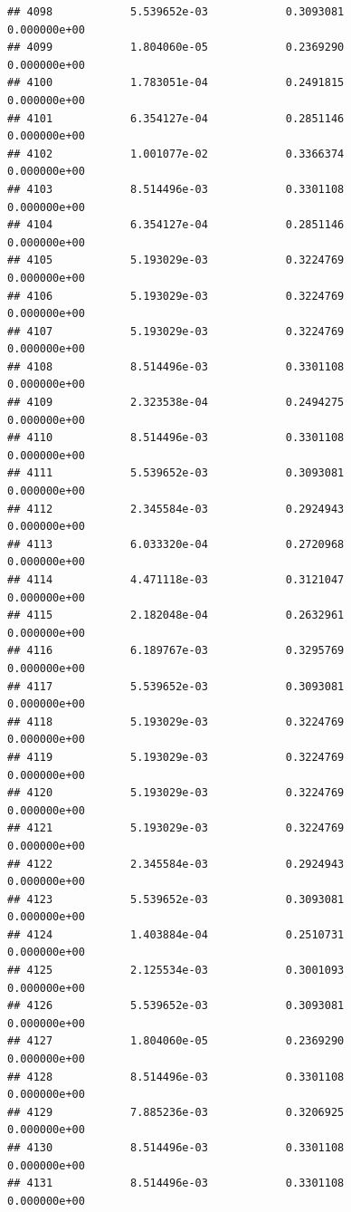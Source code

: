 \documentclass[
]{article}
\begin{document}
\begin{verbatim}
## 4098            5.539652e-03            0.3093081            0.000000e+00
## 4099            1.804060e-05            0.2369290            0.000000e+00
## 4100            1.783051e-04            0.2491815            0.000000e+00
## 4101            6.354127e-04            0.2851146            0.000000e+00
## 4102            1.001077e-02            0.3366374            0.000000e+00
## 4103            8.514496e-03            0.3301108            0.000000e+00
## 4104            6.354127e-04            0.2851146            0.000000e+00
## 4105            5.193029e-03            0.3224769            0.000000e+00
## 4106            5.193029e-03            0.3224769            0.000000e+00
## 4107            5.193029e-03            0.3224769            0.000000e+00
## 4108            8.514496e-03            0.3301108            0.000000e+00
## 4109            2.323538e-04            0.2494275            0.000000e+00
## 4110            8.514496e-03            0.3301108            0.000000e+00
## 4111            5.539652e-03            0.3093081            0.000000e+00
## 4112            2.345584e-03            0.2924943            0.000000e+00
## 4113            6.033320e-04            0.2720968            0.000000e+00
## 4114            4.471118e-03            0.3121047            0.000000e+00
## 4115            2.182048e-04            0.2632961            0.000000e+00
## 4116            6.189767e-03            0.3295769            0.000000e+00
## 4117            5.539652e-03            0.3093081            0.000000e+00
## 4118            5.193029e-03            0.3224769            0.000000e+00
## 4119            5.193029e-03            0.3224769            0.000000e+00
## 4120            5.193029e-03            0.3224769            0.000000e+00
## 4121            5.193029e-03            0.3224769            0.000000e+00
## 4122            2.345584e-03            0.2924943            0.000000e+00
## 4123            5.539652e-03            0.3093081            0.000000e+00
## 4124            1.403884e-04            0.2510731            0.000000e+00
## 4125            2.125534e-03            0.3001093            0.000000e+00
## 4126            5.539652e-03            0.3093081            0.000000e+00
## 4127            1.804060e-05            0.2369290            0.000000e+00
## 4128            8.514496e-03            0.3301108            0.000000e+00
## 4129            7.885236e-03            0.3206925            0.000000e+00
## 4130            8.514496e-03            0.3301108            0.000000e+00
## 4131            8.514496e-03            0.3301108            0.000000e+00

\end{verbatim}
\end{document}
